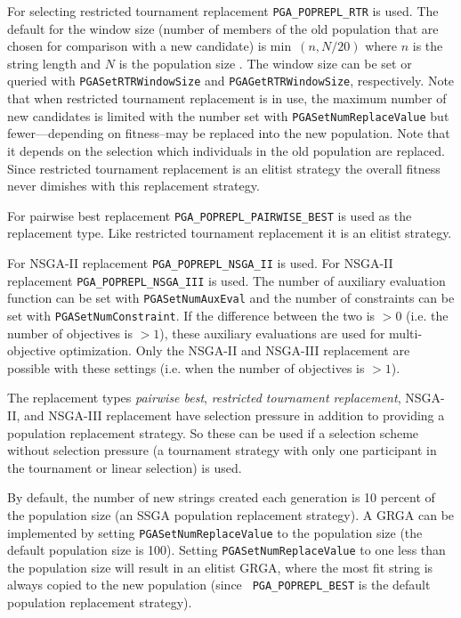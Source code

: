 \documentclass{report}
\begin{document}
For selecting restricted
tournament replacement \verb+PGA_POPREPL_RTR+ is used. The default for
the window size (number of members of the old population that are chosen
for comparison with a new candidate) is \hbox{min $(n, N/20)$} where $n$
is the string length and $N$ is the population size \cite{Pel05}.
The window size can be set or queried
with \verb+PGASetRTRWindowSize+ and \verb+PGAGetRTRWindowSize+,
respectively. Note that when restricted tournament replacement is in
use, the maximum number of new candidates is limited with the number set
with \verb+PGASetNumReplaceValue+ but fewer---depending on fitness--may
be replaced into the new population. Note that it depends on the
selection which individuals in the old population are replaced. Since
restricted tournament replacement is an elitist strategy the overall
fitness never dimishes with this replacement strategy.

For pairwise best replacement \verb+PGA_POPREPL_PAIRWISE_BEST+ is used
as the replacement type. Like restricted tournament replacement it is an
elitist strategy.

For NSGA-II replacement \verb+PGA_POPREPL_NSGA_II+ is used. For NSGA-II
replacement \verb+PGA_POPREPL_NSGA_III+ is used.  The number
of auxiliary evaluation function can be set with \verb+PGASetNumAuxEval+
and the number of constraints can be set with \verb+PGASetNumConstraint+.
If the difference between the two is $>0$ (i.e. the number of objectives
is $>1$), these auxiliary evaluations are used for multi-objective
optimization. Only the NSGA-II and NSGA-III replacement are possible
with these settings (i.e. when the number of objectives is $>1$).

The replacement types \textit{pairwise best}, \textit{restricted tournament
replacement}, NSGA-II, and NSGA-III replacement have selection pressure
in addition to providing
a population replacement strategy. So these can be used if a selection
scheme without selection pressure (a tournament strategy with only one
participant in the tournament or linear selection) is used.

By default, the number of new strings created each generation is 10 percent
of the population size (an SSGA population replacement strategy).  A GRGA can
be implemented by setting {\tt PGASetNumReplaceValue} to the population size
(the default population size is 100).  Setting {\tt PGASetNumReplaceValue} to
one less than the population size will result in an elitist GRGA, where the
most fit string is always copied to the new population (since {\tt
PGA\_POPREPL\_BEST} is the default population replacement strategy).
\end{document}
